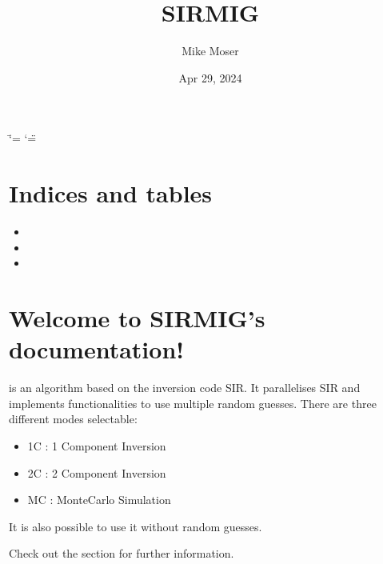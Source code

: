 \documentclass[letterpaper,10pt,english]{sphinxmanual}
\title{SIR\sphinxhyphen{}MIG}
\date{Apr 29, 2024}
\author{Mike Moser}
\begin{document}
\ifdefined\shorthandoff
  \ifnum\catcode`\=\string=\active\shorthandoff{=}\fi
  \ifnum\catcode`\"=\active{}\fi
\fi

\pagestyle{empty}
\sphinxmaketitle
\pagestyle{plain}
\sphinxtableofcontents
\pagestyle{normal}
\label{\detokenize{index::doc}}



\chapter{Indices and tables}
\label{\detokenize{index:indices-and-tables}}\begin{itemize}
\item {} 
\sphinxAtStartPar
{}

\item {} 
\sphinxAtStartPar
{}

\item {} 
\sphinxAtStartPar
{}

\end{itemize}


\chapter{Welcome to SIR\sphinxhyphen{}MIG’s documentation!}
\label{\detokenize{index:welcome-to-sir-mig-s-documentation}}
\sphinxAtStartPar
{} is an algorithm based on the inversion code SIR. It parallelises SIR and implements functionalities to use multiple random guesses.
There are three different modes selectable:
\begin{itemize}
\item {} 
\sphinxAtStartPar
1C : 1 Component Inversion

\item {} 
\sphinxAtStartPar
2C : 2 Component Inversion

\item {} 
\sphinxAtStartPar
MC : Monte\sphinxhyphen{}Carlo Simulation

\end{itemize}

\sphinxAtStartPar
It is also possible to use it without random guesses.

\sphinxAtStartPar
Check out the {\hyperref[\detokenize{usage::doc}]{}} section for further information.
\end{document}
